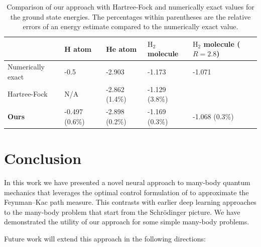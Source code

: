\documentclass[12pt]{msml2020} %
\begin{document}
\begin{table}[]  %
    \centering
    \begin{tabular}{ p{3cm} | p{2.3cm} p{2.3cm} p{2.3cm} p{2.3cm}} 
              & H atom    & He atom   & $\text{H}_2$ molecule & $\text{H}_2$ molecule ($R=2.8$)\\
 \hline
  Numerically exact  & -0.5      & -2.903    &  -1.173   & -1.071\\
 Hartree-Fock   & N/A        & -2.862 (1.4\%)   &  -1.129 (3.8\%)   & \\
 \textbf{Ours}  &-0.497 (0.6\%)  & -2.898 (0.2\%) &  -1.169 (0.3\%)    & -1.068 (0.3\%)
\end{tabular}
    \caption{Comparison of our approach with Hartree-Fock and numerically exact values for the ground state energies. The percentages within parentheses are the relative errors of an energy estimate compared to the numerically exact value.}
    \label{tab:results}
\end{table}


\hfill \break



%
\section{Conclusion}\label{sec:con}

In this work we have presented a novel neural approach to many-body quantum mechanics that leverages the optimal control formulation of \cite{Holland:1977aa} to approximate the Feynman--Kac path measure. This contrasts with earlier deep learning approaches to the many-body problem that start from the Schr\"odinger picture. We have demonstrated the utility of our approach for some simple many-body problems.

Future work will extend this approach in the following directions:
\end{document}
